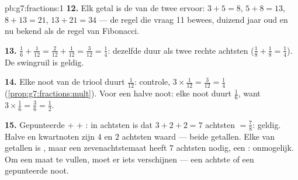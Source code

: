 \begin{solution}{pb:g7:fractions:1}
\textbf{12.} Elk getal is de  van de twee ervoor: $3 + 5 = 8$, $5 + 8 = 13$,
$8 + 13 = 21$, $13 + 21 = 34$ --- de regel die vraag 11 bewees, duizend jaar oud
en nu bekend als de regel van Fibonacci.

\textbf{13.} $\frac16 + \frac{1}{12} = \frac{2}{12} + \frac{1}{12} =
\frac{3}{12} = \frac14$: dezelfde duur als twee rechte achtsten
($\frac18 + \frac18 = \frac14$). De swingruil is geldig.

\textbf{14.} Elke noot van de triool duurt $\frac{1}{12}$: controle,
$3 \times \frac{1}{12} = \frac{3}{12} = \frac14$
(\cref{prop:g7:fractions:mult}). Voor een halve noot: elke noot duurt $\frac16$,
want $3 \times \frac16 = \frac36 = \frac12$.

\textbf{15.} Gepunteerde  $+$  $+$ : in achtsten is dat
$3 + 2 + 2 = 7$ achtsten $= \frac78$: geldig. Halve en kwartnoten zijn $4$ en $2$
achtsten waard --- beide \emph{} getallen. Elke  van  getallen is ,
maar een zevenachtstemaat heeft $7$ achtsten nodig, een : onmogelijk.
Om een  maat te vullen, moet er iets  verschijnen --- een achtste of
een gepunteerde noot.
\end{solution}
